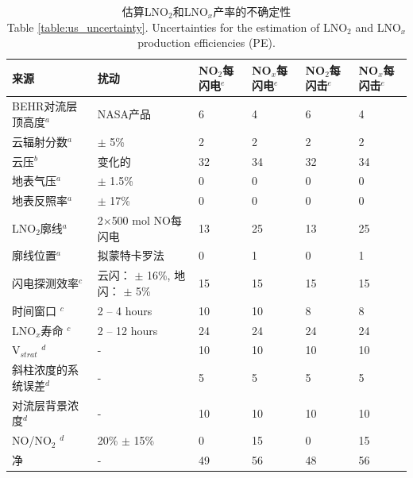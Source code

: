 \begin{table}[!htbp]
\centering
\caption{估算LNO$_2$和LNO$_x$产率的不确定性\\ Table \ref{table:us_uncertainty}. Uncertainties for the estimation of LNO$_2$ and LNO$_x$ production efficiencies (PE).}
\scriptsize
\begin{tabular}{llllll}
\hline
来源 & 扰动 & NO$_2$每闪电$^e$ & NO$_x$每闪电$^e$ & NO$_2$每闪击$^e$ & NO$_x$每闪击$^e$ \\
\hline
BEHR对流层顶高度$^a$                    & NASA产品                              & 6   & 4   & 6   & 4 \\
云辐射分数$^a$                          & $\pm$ 5\%                            & 2   & 2   & 2   & 2 \\
云压$^b$                               & 变化的                                & 32  & 34  & 32  & 34 \\
地表气压$^a$                            & $\pm$ 1.5\%                          & 0   & 0   & 0   & 0 \\
地表反照率$^a$                          & $\pm$ 17\%                           & 0   & 0   & 0   & 0 \\
LNO$_2$廓线$^a$               & 2$\times$500 mol NO每闪电             & 13  & 25  & 13  & 25 \\
廓线位置$^a$                            & 拟蒙特卡罗法                           & 0   & 1   & 0   & 1 \\
闪电探测效率$^c$                        & 云闪： $\pm$ 16\%, 地闪： $\pm$ 5\%        & 15  & 15  & 15  & 15 \\
时间窗口%
$^c$                                  & 2 -- 4 hours                         & 10  & 10  & 8   & 8 \\
LNO$_x$寿命%
$^c$                                  & 2 -- 12 hours                        & 24  & 24  & 24  & 24 \\
V$_{strat}$%
$^d$                                  & -                                    & 10  & 10  & 10  & 10 \\
斜柱浓度的系统误差$^d$                   & -                                    & 5   & 5   & 5   & 5 \\
对流层背景浓度$^d$           & -                                    & 10  & 10  & 10  & 10  \\
NO/NO$_2$%
$^d$                                  & 20\% $\pm$ 15\%                      & 0   & 15  & 0   & 15 \\
净                                   & -                                    & 49  & 56  & 48  & 56 \\

\end{tabular}
\end{table}
